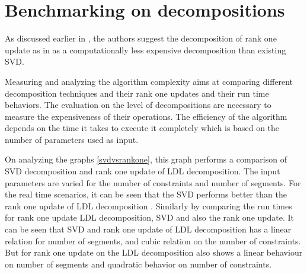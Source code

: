 


\newpage
\section{Benchmarking on decompositions}
As discussed earlier in \cite{shakhimardanov2015composable}, the authors suggest the decomposition of rank one update as in \cite{sentana1999econometric} as a computationally less expensive decomposition than existing SVD. 


Measuring and analyzing the algorithm complexity aims at comparing different decomposition techniques and their rank one updates and their run time behaviors. The evaluation on the level of decompositions are necessary to measure the expensiveness of their operations. The efficiency of the algorithm depends on the time it takes to execute it completely which is based on the number of parameters used as input.


On analyzing the graphs \ref{svdvsrankone}, this graph performs a comparison of SVD decomposition and rank one update of LDL decomposition. The input parameters are varied for the number of constraints and number of segments. For the real time scenarios, it can be seen that the SVD performs better than the rank one update of LDL decomposition \cite{sentana1999econometric}. Similarly by comparing the run times for rank one update LDL decomposition, SVD and also the rank one update. It can be seen that SVD and rank one update of LDL decomposition has a linear relation for number of segments, and cubic relation on the number of constraints. But for rank one update on the LDL decomposition also shows a linear behaviour on number of segments and quadratic behavior on number of constraints.

